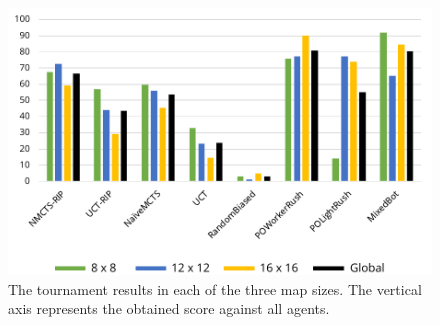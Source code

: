 \documentclass[conference]{IEEEtran}
\newcommand{\squeezeup}{\vspace{-2.0mm}}
\begin{document}
\begin{figure}[!t]
\begin{center}
	\includegraphics[width=1\columnwidth]{figs/TR.pdf}
	\caption{The tournament results in each of the three map sizes. The vertical axis represents the obtained score against all agents.}
	\label{TournamentResultsAllMaps}
\end{center}
\squeezeup
\end{figure}
\end{document}
